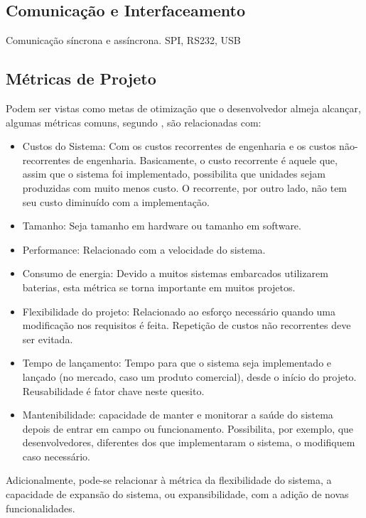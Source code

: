 \subsection{\textbf{Comunicação e Interfaceamento}}
\label{subsec:sub01_ComunicacaoEInterfaceamento}

Comunicação síncrona e assíncrona.
SPI, RS232, USB

\subsection{\textbf{Métricas de Projeto}}
\label{subsec:sub01_ComunicacaoEInterfaceamento}
Podem ser vistas como metas de otimização que o desenvolvedor almeja alcançar, algumas métricas comuns, segundo , são relacionadas com:
\begin{itemize}
    \item Custos do Sistema: Com os custos recorrentes de engenharia e os custos não-recorrentes de engenharia. Basicamente, o custo recorrente é aquele que, assim que o sistema foi implementado, possibilita que unidades sejam produzidas com muito menos custo. O recorrente, por outro lado, não tem seu custo diminuído com a implementação.
    \item Tamanho: Seja tamanho em hardware ou tamanho em software.
    \item Performance: Relacionado com a velocidade do sistema.
    \item Consumo de energia: Devido a muitos sistemas embarcados utilizarem baterias, esta métrica se torna importante em muitos projetos. 
    \item Flexibilidade do projeto: Relacionado ao esforço necessário quando uma modificação nos requisitos é feita. Repetição de custos não recorrentes deve ser evitada.
    \item Tempo de lançamento: Tempo para que o sistema seja implementado e lançado (no mercado, caso um produto comercial), desde o início do projeto. Reusabilidade é fator chave neste quesito.
    \item Mantenibilidade: capacidade de manter e monitorar a saúde do sistema depois de entrar em campo ou funcionamento. Possibilita, por exemplo, que desenvolvedores, diferentes dos que implementaram o sistema, o modifiquem caso necessário.
\end{itemize}
Adicionalmente, pode-se relacionar à métrica da flexibilidade do sistema, a capacidade de expansão do sistema, ou expansibilidade, com a adição de novas funcionalidades.

